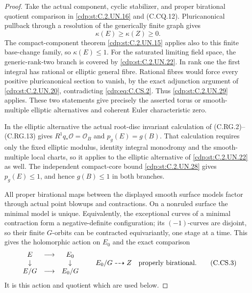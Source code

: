 \begin{proof}
Take the actual component, cyclic stabilizer, and
proper birational quotient comparison in \ref{cdp:st:C.2.UN.16}
and (C.CQ.12). Pluricanonical pullback through a
resolution of the generically finite graph gives
\[
             \kappa(E)\ge\kappa(Z)\ge0.
                                                               \tag{C.CS.2}\label{cdp:eq:C.CS.2}
\]
The compact-component theorem \ref{cdp:st:C.2.UN.15} applies
also to this finite base-change family, so
$\kappa(E)\le1$. For the saturated limiting field
space, the generic-rank-two branch is covered
by \ref{cdp:st:C.2.UN.22}. In rank one the first integral
has rational or elliptic general fibre. Rational
fibres would force every positive pluricanonical
section to vanish, by the exact adjunction
argument of \ref{cdp:st:C.2.UN.20}, contradicting \eqref{cdp:eq:C.CS.2}.
Thus \ref{cdp:st:C.2.UN.29} applies. These two statements
give precisely the asserted torus or smooth-multiple
elliptic alternatives and coherent Euler characteristic
zero.

In the elliptic alternative the actual root-disc
invariant calculation of (C.RG.2)--(C.RG.13) gives
$R^1q_*\mathcal O=\mathcal O_B$ and
$p_g(E)=g(B)$. That calculation requires only
the fixed elliptic modulus, identity integral
monodromy and the smooth-multiple local charts,
so it applies to the elliptic alternative of
\ref{cdp:st:C.2.UN.22} as well. The independent compact-core
bound \ref{cdp:st:C.2.UN.28} gives $p_g(E)\le1$, and hence
$g(B)\le1$ in both branches.

All proper birational maps between the displayed
smooth surface models factor through actual
point blowups and contractions. On a nonruled
surface the minimal model is unique. Equivalently,
the exceptional curves of a minimal contraction
form a negative-definite configuration; its
$(-1)$-curves are disjoint, so their finite
$G$-orbits can be contracted equivariantly,
one stage at a time. This gives the holomorphic
action on $E_0$ and the exact comparison
\[
 \begin{array}{ccc}
 E&\longrightarrow&E_0\\
 \downarrow&&\downarrow\\
 E/G&\longrightarrow&E_0/G
 \end{array}
 \qquad E_0/G\dashrightarrow Z
       \quad\hbox{properly birational}.
                                                               \tag{C.CS.3}\label{cdp:eq:C.CS.3}
\]
It is this action and quotient which are used
below.


\end{proof}
